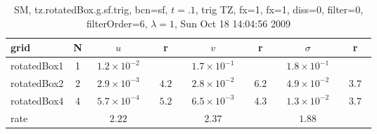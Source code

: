 \begin{table}[hbt]\tableFont %
\begin{center}
\begin{tabular}{|l|c|c|c|c|c|c|c|} \hline 
grid  & N &  $u$  & r &  $v$  & r &  $\sigma$   & r \\ \hline 
         rotatedBox1 &     1 & ~$1.2\times10^{ -2}$~ &           & ~$1.7\times10^{ -1}$~ &           & ~$1.8\times10^{ -1}$~ &            \\ \hline
         rotatedBox2 &     2 & ~$2.9\times10^{ -3}$~ & ~$  4.2$~ & ~$2.8\times10^{ -2}$~ & ~$  6.2$~ & ~$4.9\times10^{ -2}$~ & ~$  3.7$~  \\ \hline
         rotatedBox4 &     4 & ~$5.7\times10^{ -4}$~ & ~$  5.2$~ & ~$6.5\times10^{ -3}$~ & ~$  4.3$~ & ~$1.3\times10^{ -2}$~ & ~$  3.7$~  \\ \hline
    rate             &       &       $2.22$         &       &       $2.37$         &       &       $1.88$         &        \\ \hline
\end{tabular}
\caption{SM, tz.rotatedBox.g.sf.trig, bcn=sf, $t=.1$, trig TZ, fx=1, fx=1, diss=0, filter=0, filterOrder=6, $\lambda=1$,  Sun Oct 18 14:04:56 2009}\label{table:tz.rotatedBox.g.sf.trig}
\end{center}
\end{table}

